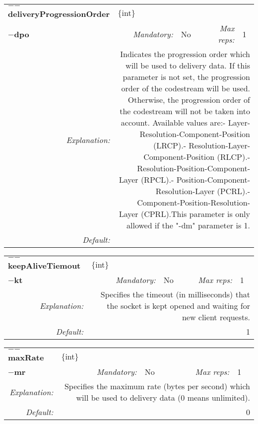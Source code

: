 \begin{center}\begin{tabular}{|rr|rl|rl|}
\hline
\multicolumn{2}{|l|}{\textbf{$-$$-$deliveryProgressionOrder}} & \multicolumn{4}{|l|}{$\{$int$\}$} \\
\cline{3-6}
\multicolumn{2}{|l|}{\textbf{$-$dpo}} & \emph{Mandatory:} & No & \emph{Max reps:} & 1 \\
\hline
\emph{Explanation:} & \multicolumn{5}{|p{12cm}|}{Indicates the progression order which will be used to delivery data. If this parameter is not set, the progression order of the codestream will be used. Otherwise, the progression order of the codestream will not be taken into account. Available values are:\newline	0- Layer-Resolution-Component-Position (LRCP).\newline	1- Resolution-Layer-Component-Position (RLCP).\newline	 2- Resolution-Position-Component-Layer (RPCL).\newline	 3- Position-Component-Resolution-Layer (PCRL).\newline 	4- Component-Position-Resolution-Layer (CPRL).\newline This parameter is only allowed if the "-dm" parameter is 1.} \\
\hline
\emph{Default:} & \multicolumn{5}{|p{12cm}|}{} \\
\hline
\end{tabular}\end{center}
\begin{center}\begin{tabular}{|rr|rl|rl|}
\hline
\multicolumn{2}{|l|}{\textbf{$-$$-$keepAliveTiemout}} & \multicolumn{4}{|l|}{$\{$int$\}$} \\
\cline{3-6}
\multicolumn{2}{|l|}{\textbf{$-$kt}} & \emph{Mandatory:} & No & \emph{Max reps:} & 1 \\
\hline
\emph{Explanation:} & \multicolumn{5}{|p{12cm}|}{Specifies the timeout (in milliseconds) that the socket is kept opened and waiting for new client requests.} \\
\hline
\emph{Default:} & \multicolumn{5}{|p{12cm}|}{1} \\
\hline
\end{tabular}\end{center}
\begin{center}\begin{tabular}{|rr|rl|rl|}
\hline
\multicolumn{2}{|l|}{\textbf{$-$$-$maxRate}} & \multicolumn{4}{|l|}{$\{$int$\}$} \\
\cline{3-6}
\multicolumn{2}{|l|}{\textbf{$-$mr}} & \emph{Mandatory:} & No & \emph{Max reps:} & 1 \\
\hline
\emph{Explanation:} & \multicolumn{5}{|p{12cm}|}{Specifies the maximum rate (bytes per second) which will be used to delivery data (0 means unlimited).} \\
\hline
\emph{Default:} & \multicolumn{5}{|p{12cm}|}{0} \\
\hline
\end{tabular}\end{center}
